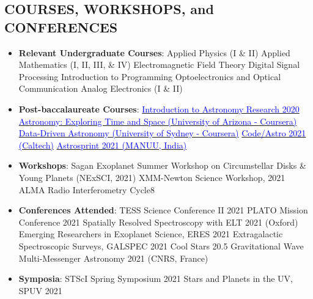 \documentclass[11pt]{res} %
\begin{document}
\begin{resume}
\section{COURSES, WORKSHOPS, and CONFERENCES}
\vspace{0.25in}
\begin{itemize}
\item \textbf{Relevant Undergraduate Courses}: \textbullet{} Applied Physics (I \& II) \textbullet{} Applied Mathematics (I, II, III, \& IV) \textbullet{} Electromagnetic Field Theory \textbullet{} Digital Signal Processing \textbullet{} Introduction to Programming \textbullet{} Optoelectronics and Optical Communication \textbullet{} Analog Electronics (I \& II)


\item \textbf{Post-baccalaureate Courses}: \textbullet{} \href{https://github.com/howardisaacson/Intro-to-Astro-2020}{\textcolor{blue}{Introduction to Astronomy Research 2020}} \textbullet{} \href{https://www.coursera.org/learn/astro}{\textcolor{blue}{Astronomy: Exploring Time and Space (University of Arizona - Coursera)}} \textbullet{} \href{https://www.coursera.org/learn/data-driven-astronomy}{\textcolor{blue}{Data-Driven Astronomy (University of Sydney - Coursera)}} \textbullet{} \href{https://semaphorep.github.io/codeastro/}{\textcolor{blue}{Code/Astro 2021 (Caltech)}} \textbullet{} \href{https://www.astrosprint2021.com/}{\textcolor{blue}{Astrosprint 2021 (MANUU, India)}}

\item \textbf{Workshops}: \textbullet{} Sagan Exoplanet Summer Workshop on Circumstellar Disks \& Young Planets (NExSCI, 2021) \textbullet{} XMM-Newton Science Workshop, 2021 \textbullet{} ALMA Radio Interferometry Cycle8

\item \textbf{Conferences Attended}: \textbullet{} TESS Science Conference II 2021 \textbullet{} PLATO Mission Conference 2021 \textbullet{} Spatially Resolved Spectroscopy with ELT 2021 (Oxford) \textbullet{} Emerging Researchers in Exoplanet Science, ERES 2021 \textbullet{} Extragalactic Spectroscopic Surveys, GALSPEC 2021 \textbullet{} Cool Stars 20.5 \textbullet{} Gravitational Wave Multi-Messenger Astronomy 2021 (CNRS, France)

\item \textbf{Symposia}: \textbullet{} STScI Spring Symposium 2021 \textbullet{} Stars and Planets in the UV, SPUV 2021
\end{itemize}
\vspace{0.1in}
\hline



\end{resume}
\end{document}
